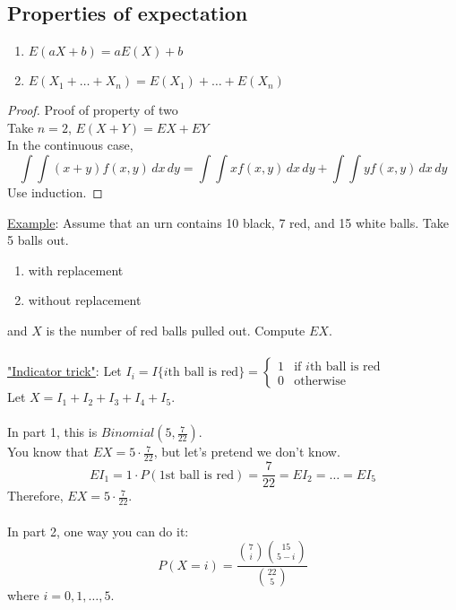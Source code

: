  \subsection*{Properties of expectation}
    \begin{enumerate}
      \item $E(aX + b) = aE(X) + b$
      \item $E(X_1 + \ldots + X_n) = E(X_1) + \ldots + E(X_n)$
    \end{enumerate}
    \begin{proof}
      Proof of property of two\\
      Take $n = 2$, $E(X+Y) = EX + EY$\\
      In the continuous case,
      $$
        \int\int(x+y)f(x,y)\,dx\,dy = \int\int xf(x,y)\,dx\,dy + \int\int y
        f(x,y)\,dx\,dy
      $$
      Use induction.
    \end{proof}
    \underline{Example}: Assume that an urn contains 10 black, 7 red, and 
      15 white balls. Take 5 balls out.
      \begin{enumerate}
        \item with replacement
        \item without replacement
      \end{enumerate}
      and $X$ is the number of red balls pulled out. Compute $EX$.\\\\
    \underline{"Indicator trick"}: Let $I_i = I\{i\text{th ball is red}\} = 
    \begin{cases}1 & \text{if $i$th ball is red}\\ 0 & \text{otherwise}
    \end{cases}$\\
   Let $X = I_1 + I_2 + I_3 + I_4 + I_5$.\\\\
   In part 1, this is $Binomial(5, \frac{7}{22})$.\\
   You know that $EX = 5 \cdot \frac{7}{22}$, but let's pretend we don't know.\\
   $$
    EI_1 = 1 \cdot P(\text{1st ball is red}) = \frac{7}{22} = EI_2 = \ldots
    = EI_5
   $$
   Therefore, $EX = 5 \cdot \frac{7}{22}$.\\\\
   In part 2, one way you can do it:\\
   $$
    P(X = i) = \frac{\binom{7}{i}\binom{15}{5-i}}{\binom{22}{5}}
   $$
   where $i = 0, 1, \ldots, 5$.\\
